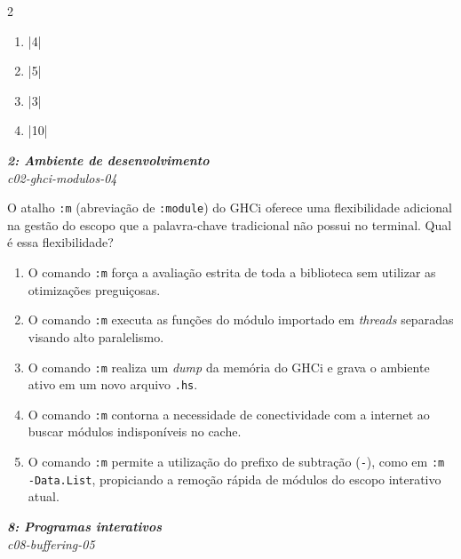 \documentclass[a4paper,10pt,brazil]{article}
\begin{document}
\begin{multicols}{2}
\begin{enumerate}
  \item \haskellinline|4|

  \item \haskellinline|5|

  \item \haskellinline|3|

  \item \haskellinline|10|


\end{enumerate}

\begin{flushright}
  \footnotesize
  \textit{\textbf{2: Ambiente de desenvolvimento}}\\
  \textit{c02-ghci-modulos-04}\\

\end{flushright}
O atalho \texttt{:m} (abreviação de \texttt{:module}) do GHCi oferece uma flexibilidade adicional na gestão do escopo que a palavra-chave tradicional  não possui no terminal. Qual é essa flexibilidade?

\begin{enumerate}
  \item O comando \texttt{:m} força a avaliação estrita de toda a biblioteca sem utilizar as otimizações preguiçosas.

  \item O comando \texttt{:m} executa as funções do módulo importado em \emph{threads} separadas visando alto paralelismo.

  \item O comando \texttt{:m} realiza um \emph{dump} da memória do GHCi e grava o ambiente ativo em um novo arquivo \texttt{.hs}.

  \item O comando \texttt{:m} contorna a necessidade de conectividade com a internet ao buscar módulos indisponíveis no cache.

  \item O comando \texttt{:m} permite a utilização do prefixo de subtração (\texttt{-}), como em \texttt{:m -Data.List}, propiciando a remoção rápida de módulos do escopo interativo atual.


\end{enumerate}

\begin{flushright}
  \footnotesize
  \textit{\textbf{8: Programas interativos}}\\
  \textit{c08-buffering-05}\\


\end{flushright}
\end{multicols}
\end{document}
